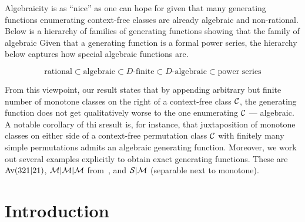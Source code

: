 \documentclass[12pt, a4paper, twoside]{report}
\begin{document}
Algebraicity is as ``nice'' as one can hope for given that many generating functions enumerating context-free classes are already algebraic and non-rational. Below is a hierarchy of families of generating functions showing that the family of algebraic Given that a generating function is a formal power series, the hierarchy below captures how special algebraic functions are.

$$\text{rational} \subset \text{algebraic} \subset \text{$D$-finite} \subset \text{$D$-algebraic} \subset \text{power series}$$

From this viewpoint, our result states that by appending arbitrary but finite number of monotone classes on the right of a context-free class $\mathcal{C}$, the generating function does not get qualitatively worse to the one enumerating $\mathcal{C}$ --- algebraic. A notable corollary of thi sresult is, for instance, that juxtaposition of monotone classes on either side of a context-free permutation class $\mathcal{C}$ with finitely many simple permutations admits an algebraic generating function. Moreover, we work out several examples explicitly to obtain exact generating functions. These are $\mathrm{Av}(321|21)$, $\mathcal{M}|\mathcal{M}|\mathcal{M}$ from~\cite{bevan2015thesis}, and $\mathcal{S}|\mathcal{M}$ (separable next to monotone).


\section{Introduction}
\label{sec:iterjuxt_intro}
\end{document}
